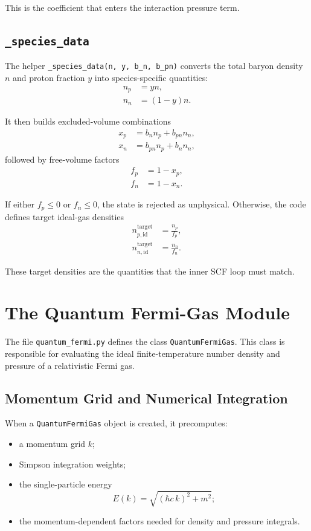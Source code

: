 \documentclass[11pt]{article}
\begin{document}
This is the coefficient that enters the interaction pressure term.

\subsection{\texttt{\_species\_data}}

The helper \texttt{\_species\_data(n, y, b\_n, b\_{pn})} converts the total
baryon density $n$ and proton fraction $y$ into species-specific quantities:
\begin{align}
n_p &= yn, \\
n_n &= (1-y)n.
\end{align}

It then builds excluded-volume combinations
\begin{align}
x_p &= b_n n_p + b_{pn} n_n, \\
x_n &= b_{pn} n_p + b_n n_n,
\end{align}
followed by free-volume factors
\begin{align}
f_p &= 1 - x_p, \\
f_n &= 1 - x_n.
\end{align}

If either $f_p \le 0$ or $f_n \le 0$, the state is rejected as unphysical.
Otherwise, the code defines target ideal-gas densities
\begin{align}
n_{p,\mathrm{id}}^{\mathrm{target}} &= \frac{n_p}{f_p}, \\
n_{n,\mathrm{id}}^{\mathrm{target}} &= \frac{n_n}{f_n}.
\end{align}

These target densities are the quantities that the inner SCF loop must match.

\section{The Quantum Fermi-Gas Module}

The file \texttt{quantum\_fermi.py} defines the class
\texttt{QuantumFermiGas}. This class is responsible for evaluating the ideal
finite-temperature number density and pressure of a relativistic Fermi gas.

\subsection{Momentum Grid and Numerical Integration}

When a \texttt{QuantumFermiGas} object is created, it precomputes:
\begin{itemize}
\item a momentum grid $k$;
\item Simpson integration weights;
\item the single-particle energy
\[
E(k) = \sqrt{(\hbar c\, k)^2 + m^2};
\]
\item the momentum-dependent factors needed for density and pressure
integrals.
\end{itemize}
\end{document}
